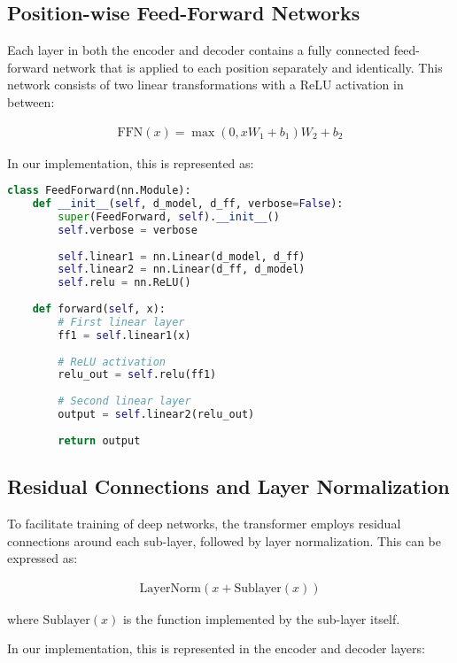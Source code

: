 \documentclass{article}
\begin{document}
\subsection{Position-wise Feed-Forward Networks}

Each layer in both the encoder and decoder contains a fully connected feed-forward network that is applied to each position separately and identically. This network consists of two linear transformations with a ReLU activation in between:

\begin{align}
\text{FFN}(x) = \max(0, xW_1 + b_1)W_2 + b_2
\end{align}

In our implementation, this is represented as:

\begin{lstlisting}[language=Python, caption=Feed-Forward Network]
class FeedForward(nn.Module):
    def __init__(self, d_model, d_ff, verbose=False):
        super(FeedForward, self).__init__()
        self.verbose = verbose
        
        self.linear1 = nn.Linear(d_model, d_ff)
        self.linear2 = nn.Linear(d_ff, d_model)
        self.relu = nn.ReLU()
        
    def forward(self, x):
        # First linear layer
        ff1 = self.linear1(x)
        
        # ReLU activation
        relu_out = self.relu(ff1)
        
        # Second linear layer
        output = self.linear2(relu_out)
        
        return output
\end{lstlisting}

\subsection{Residual Connections and Layer Normalization}

To facilitate training of deep networks, the transformer employs residual connections around each sub-layer, followed by layer normalization. This can be expressed as:

\begin{align}
\text{LayerNorm}(x + \text{Sublayer}(x))
\end{align}

where $\text{Sublayer}(x)$ is the function implemented by the sub-layer itself.

In our implementation, this is represented in the encoder and decoder layers:
\end{document}
